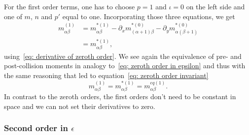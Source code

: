For the first order terms, one has to choose $p=1$ and $\iota=0$ on the left side and one of $m$, $n$ and $p'$ equal to one.
Incorporating those three equations, we get
\begin{equation}
  \label{eq: first order in epsilon}
  \begin{aligned}
  m_{\alpha\beta}^{(1)}
  & = m_{\alpha\beta}^{*(1)}
  - \partial_x m_{(\alpha+1)\beta}^{*(0)} - \partial_y m_{\alpha(\beta+1)}^{*(0)} \\
  & = m_{\alpha\beta}^{*(1)},
  \end{aligned}
\end{equation}
using~\eqref{eq: derivative of zeroth order}.
We see again the equivalence of pre- and post-collision moments in analogy to~\eqref{eq: zeroth order in epsilon} and thus with the same reasoning that led to equation~\eqref{eq: zeroth order invariant}
\begin{equation}
  \label{eq: first order invariant}
  m_{\alpha\beta}^{(1)} = m_{\alpha\beta}^{*(1)} = m_{\alpha\beta}^{eq(1)}.
\end{equation}
In contrast to the zeroth orders, the first orders don't need to be constant in space and we can not set their derivatives to zero.

\subsubsection{Second order in \texorpdfstring{$\epsilon$}{epsilon}}
\label{subs: Second order in epsilon}

